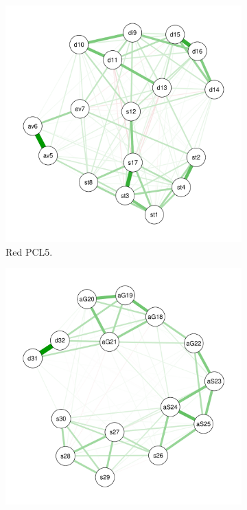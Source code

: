\documentclass[11pt,spanish]{article}\usepackage[]{graphicx}\usepackage[]{color}
\begin{document}
\begin{figure}
\centering
\begin{subfigure}{0.45\textwidth}
    \includegraphics[width=\textwidth]{images/net_pcl5.pdf}
    \caption{Red PCL5.}
    \label{fig:netpcl5}
\end{subfigure}
\hfill
\begin{subfigure}{0.45\textwidth}
    \includegraphics[width=\textwidth]{images/net_dean.pdf}

\end{subfigure}
\end{figure}
\end{document}
